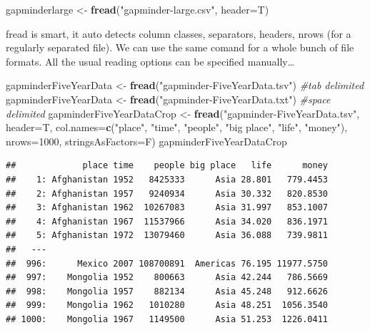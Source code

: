 \documentclass[]{article}
\newenvironment{Shaded}{\begin{snugshade}}{\end{snugshade}}
\newcommand{\KeywordTok}[1]{\textcolor[rgb]{0.13,0.29,0.53}{\textbf{{#1}}}}
\newcommand{\DataTypeTok}[1]{\textcolor[rgb]{0.13,0.29,0.53}{{#1}}}
\newcommand{\DecValTok}[1]{\textcolor[rgb]{0.00,0.00,0.81}{{#1}}}
\newcommand{\StringTok}[1]{\textcolor[rgb]{0.31,0.60,0.02}{{#1}}}
\newcommand{\CommentTok}[1]{\textcolor[rgb]{0.56,0.35,0.01}{\textit{{#1}}}}
\newcommand{\NormalTok}[1]{{#1}}
\begin{document}
\begin{Shaded}
\begin{Highlighting}[]
\NormalTok{gapminderlarge <-}\StringTok{ }\KeywordTok{fread}\NormalTok{(}\StringTok{"gapminder-large.csv"}\NormalTok{, }\DataTypeTok{header=}\NormalTok{T)}
\end{Highlighting}
\end{Shaded}

fread is smart, it auto detects column classes, separators, headers,
nrows (for a regularly separated file). We can use the same comand for a
whole bunch of file formats. All the usual reading options can be
specified manually\ldots{}

\begin{Shaded}
\begin{Highlighting}[]
\NormalTok{gapminderFiveYearData <-}\StringTok{ }\KeywordTok{fread}\NormalTok{(}\StringTok{"gapminder-FiveYearData.tsv"}\NormalTok{) }\CommentTok{#tab delimited}
\NormalTok{gapminderFiveYearData <-}\StringTok{ }\KeywordTok{fread}\NormalTok{(}\StringTok{"gapminder-FiveYearData.txt"}\NormalTok{) }\CommentTok{#space delimited}
\NormalTok{gapminderFiveYearDataCrop <-}\StringTok{ }\KeywordTok{fread}\NormalTok{(}\StringTok{"gapminder-FiveYearData.tsv"}\NormalTok{, }\DataTypeTok{header=}\NormalTok{T, }\DataTypeTok{col.names=}\KeywordTok{c}\NormalTok{(}\StringTok{"place"}\NormalTok{, }\StringTok{"time"}\NormalTok{, }\StringTok{"people"}\NormalTok{, }\StringTok{"big place"}\NormalTok{, }\StringTok{"life"}\NormalTok{, }\StringTok{"money"}\NormalTok{), }\DataTypeTok{nrows=}\DecValTok{1000}\NormalTok{, }\DataTypeTok{stringsAsFactors=}\NormalTok{F)}
\NormalTok{gapminderFiveYearDataCrop}
\end{Highlighting}
\end{Shaded}

\begin{verbatim}
##             place time    people big place   life      money
##    1: Afghanistan 1952   8425333      Asia 28.801   779.4453
##    2: Afghanistan 1957   9240934      Asia 30.332   820.8530
##    3: Afghanistan 1962  10267083      Asia 31.997   853.1007
##    4: Afghanistan 1967  11537966      Asia 34.020   836.1971
##    5: Afghanistan 1972  13079460      Asia 36.088   739.9811
##   ---                                                       
##  996:      Mexico 2007 108700891  Americas 76.195 11977.5750
##  997:    Mongolia 1952    800663      Asia 42.244   786.5669
##  998:    Mongolia 1957    882134      Asia 45.248   912.6626
##  999:    Mongolia 1962   1010280      Asia 48.251  1056.3540
## 1000:    Mongolia 1967   1149500      Asia 51.253  1226.0411
\end{verbatim}
\end{document}
